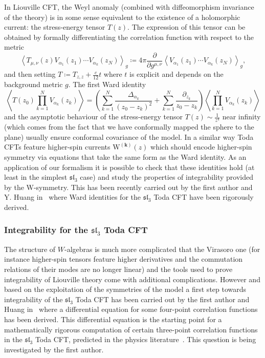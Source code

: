 \documentclass[10pt]{amsart}
\theoremstyle{definition}\newtheorem{defi}[theo]{Definition}\newtheorem{rema}[theo]{Remark}\newtheorem{exam}[theo]{Example}\newtheorem{exem}[theo]{Example}\newtheorem{nota}[theo]{Notation}
\newcommand{\frksl}{\mathfrak{sl}}
\newcommand{\rmW}{\mathrm{W}}
\begin{document}
In Liouville CFT, the Weyl anomaly (combined with diffeomorphism invariance of the theory) is in some sense equivalent to the existence of a holomorphic current: the stress-energy tensor $T(z)$. The expression of this tensor can be obtained by formally differentiating the correlation function with respect to the metric
\[
\left\langle T_{\mu,\nu}(z)V_{\alpha_1}(z_1) \cdots V_{\alpha_k}(z_N) \right\rangle_{g}\coloneqq 4\pi\frac{\partial}{\partial g^{\mu,\nu}}\left\langle V_{\alpha_1}(z_1) \cdots V_{\alpha_k}(z_N) \right\rangle_{g},
\]
and then setting $T\coloneqq T_{z,z}+\frac{c}{12}t$ where $t$ is explicit and depends on the background metric $g$. The first Ward identity
\begin{equation}
\left\langle T(z_0)\prod_{k=1}^NV_{\alpha_k}(z_k)\right\rangle = \left(\sum_{k=1}^N \frac{\Delta_{\alpha_k}}{(z_0-z_k)^2}+\sum_{k=1}^N\frac{\partial_{z_k}}{z_0-z_k}\right)\left\langle\prod_{k=1}^NV_{\alpha_k}(z_k)\right\rangle
\end{equation}
and the asymptotic behaviour of the stress-energy tensor $T(z)\sim\frac1{z^4}$ near infinity (which comes from the fact that we have conformally mapped the sphere to the plane) usually ensure conformal covariance of the model. In a similar way Toda CFTs feature higher-spin currents $\bm {\rmW^{(k)}}(z)$ which should encode higher-spin symmetry via equations that take the same form as the Ward identity. As an application of our formalism it is possible to check that these identities hold (at least in the simplest $\frksl_3$ case) and study the properties of integrability provided by the W-symmetry. This has been recently carried out by the first author and Y. Huang in~\cite{Toda_OPEWV} where Ward identities for the $\frksl_3$ Toda CFT have been rigorously derived.

\subsubsection{Integrability for the \texorpdfstring{$\frksl_3$}{sl3} Toda CFT}

The structure of $W$-algebras is much more complicated that the Virasoro one (for instance higher-spin tensors feature higher derivatives and the commutation relations of their modes are no longer linear) and the tools used to prove integrability of Liouville theory come with additional complications. However and based on the exploitation of the symmetries of the model a first step towards integrability of the $\frksl_3$ Toda CFT has been carried out by the first author and Huang in~\cite{Toda_OPEWV} where a differential equation for some four-point correlation functions has been derived. This differential equation is the starting point for a mathematically rigorous computation of certain three-point correlation functions in the $\frksl_3$ Toda CFT, predicted in the physics literature~\cite[Equation~(14)]{FaLi0}. This question is being investigated by the first author.
\end{document}
